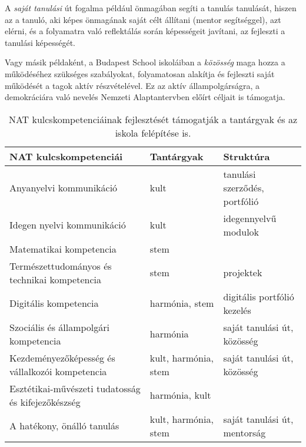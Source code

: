 A \emph{saját tanulási} út fogalma például önmagában segíti a tanulás
tanulását, hiszen az a tanuló, aki képes önmagának saját célt állítani (mentor
segítséggel), azt elérni, és a folyamatra való reflektálás során képességeit
javítani, az fejleszti a tanulási képességét.

Vagy másik példaként, a Budapest School iskoláiban a \emph{közösség} maga hozza
a működéséhez szükséges szabályokat, folyamatosan alakítja és fejleszti saját
működését a tagok aktív részvételével. Ez az aktív állampolgárságra, a
demokráciára való nevelés Nemzeti Alaptantervben előírt céljait is támogatja.

\begin{table}
  \centering
  \begin{tabular}{p{5cm}|>{\raggedright}p{3cm}|p{3cm}}

    \textbf{NAT kulcskompetenciái}                     & \textbf{Tantárgyak}  &
    \textbf{Struktúra}                                                                                        \\ \hline
    Anyanyelvi kommunikáció                            & kult                 & tanulási szerződés, portfólió \\ \hline
    Idegen nyelvi kommunikáció                         & kult                 & idegennyelvű modulok          \\ \hline
    Matematikai kompetencia                            & stem                 &                               \\ \hline
    Természettudományos és technikai kompetencia       & stem                 & projektek                     \\ \hline
    Digitális kompetencia                              & harmónia, stem       & digitális portfólió kezelés   \\ \hline
    Szociális és állampolgári kompetencia              & harmónia             & saját tanulási út,
    közösség                                                                                                  \\ \hline
    Kezdeményezőképesség és vállalkozói kompetencia    & kult, harmónia, stem & saját
    tanulási út, közösség                                                                                     \\ \hline
    Esztétikai-művészeti tudatosság és kifejezőkészség & harmónia, kult       &                               \\ \hline
    A hatékony, önálló tanulás                         & kult, harmónia, stem & saját tanulási út,
    mentorság                                                                                                 \\

  \end{tabular}
  \caption{NAT kulcskompetenciáinak fejlesztését támogatják a tantárgyak és
    az iskola felépítése is.}
  \label{tbl:nat_kulcs}
\end{table}